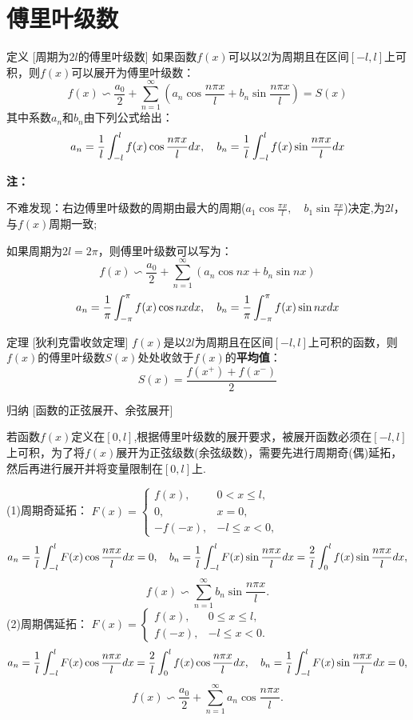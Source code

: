 \documentclass[a4paper,12pt,oneside,fontset=none]{ctexbook}
\renewcommand{\le}{\leqslant}
\let\oldint\int
\renewcommand{\int}{\displaystyle{\vrule width 0pt height 0em depth 0em}\oldint}
\let\oldsum\sum
\renewcommand{\sum}{\displaystyle\oldsum}
\newcounter{theorem}[chapter]
\newenvironment{theorem}[1][]{\begin{thmBox}{定理}{#1}}{\end{thmBox}}
\newenvironment{induction}[1][]{\begin{thmBox}{归纳}{#1}}{\end{thmBox}}
\newcounter{definition}[chapter]
\newenvironment{definition}[1][]{\begin{defBox}{定义}{#1}}{\end{defBox}}
\newenvironment{note}{
    \par\vspace{0.5em}\noindent
    \textbf{\color{NoteColor} 注：}
}{
    \par\vspace{0.5em}
}
\numberwithin{equation}{chapter}
\begin{document}
\section{傅里叶级数}
\begin{definition}
    [周期为$2l$的傅里叶级数]
    如果函数$f(x)$可以以$2l$为周期且在区间$[-l, l]$上可积，则$f(x)$可以展开为傅里叶级数：
    $$f(x) \backsim  \frac{a_0}{2} + \sum_{n=1}^{\infty} (a_n \cos \frac{n\pi x}{l} + b_n \sin \frac{n\pi x}{l}) = S(x)$$
    其中系数$a_n$和$b_n$由下列公式给出：
    $$a_n = \frac{1}{l} \int_{-l}^{l} f(x) \cos \frac{n\pi x}{l} dx, \quad b_n = \frac{1}{l} \int_{-l}^{l} f(x) \sin \frac{n\pi x}{l} dx$$
\end{definition}
\begin{note}
    不难发现：右边傅里叶级数的周期由最大的周期($a_1\cos\frac{\pi x}{l}, \quad b_1\sin\frac{\pi x}{l}$)决定,为$2l$，与$f(x)$周期一致;

    如果周期为$2l = 2\pi$，则傅里叶级数可以写为：
    $$f(x) \backsim  \frac{a_0}{2} + \sum_{n=1}^{\infty} (a_n \cos nx + b_n \sin nx)$$
    $$a_n = \frac{1}{\pi} \int_{-\pi}^{\pi} f(x) \cos nx dx, \quad b_n = \frac{1}{\pi} \int_{-\pi}^{\pi} f(x) \sin nx dx$$
\end{note}

\begin{theorem}
    [狄利克雷收敛定理]
    $f(x)$是以$2l$为周期且在区间$[-l, l]$上可积的函数，则$f(x)$的傅里叶级数$S(x)$处处收敛于$f(x)$的\textbf{平均值}：
    $$S(x) = \frac{f(x^+) + f(x^-)}{2}$$
\end{theorem}

\begin{induction}
    [函数的正弦展开、余弦展开]
    
    若函数$f(x)$定义在$[0,l]$,根据傅里叶级数的展开要求，被展开函数必须在$[-l,l]$上可积，为了将$f(x)$展开为正弦级数(余弦级数)，需要先进行周期奇(偶)延拓，然后再进行展开并将变量限制在$[0,l]$上.

    (1)周期奇延拓：
    $F(x) = \begin{cases}
        f(x), & 0 < x \le l,\\
        0, & x = 0,\\
        -f(-x), & -l \le x < 0,
    \end{cases}$
    $$a_n = \frac{1}{l} \int_{-l}^{l} F(x) \cos \frac{n\pi x}{l} dx = 0, \quad b_n = \frac{1}{l} \int_{-l}^{l} F(x) \sin \frac{n\pi x}{l} dx = \frac{2}{l} \int_{0}^{l} f(x) \sin \frac{n\pi x}{l} dx,$$
    $$f(x) \backsim \sum_{n=1}^{\infty} b_n \sin \frac{n\pi x}{l}.$$
    (2)周期偶延拓：
    $F(x) = \begin{cases}
        f(x), & 0 \le x \le l,\\
        f(-x), & -l \le x < 0.
    \end{cases}$
    $$a_n = \frac{1}{l} \int_{-l}^{l} F(x) \cos \frac{n\pi x}{l} dx = \frac{2}{l} \int_{0}^{l} f(x) \cos \frac{n\pi x}{l} dx, \quad b_n = \frac{1}{l} \int_{-l}^{l} F(x) \sin \frac{n\pi x}{l} dx = 0,$$
    $$f(x) \backsim \frac{a_0}{2} + \sum_{n=1}^{\infty} a_n \cos \frac{n\pi x}{l}.$$

\end{induction}
\end{document}
